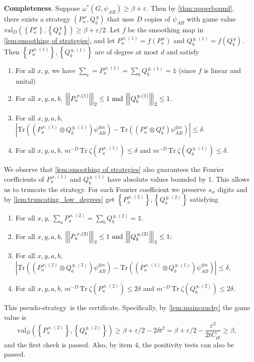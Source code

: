 \documentclass[11pt]{article}
\theoremstyle{plain}
\theoremstyle{definition}
\newcommand {\set} [1] {\ensuremath{ \left\lbrace #1 \right\rbrace }}
\newcommand {\br} [1] {\ensuremath{ \left( #1 \right) }}
\newcommand {\ab} [1] {\ensuremath{ \left| #1 \right| }}
\newcommand{\nnorm}[1]{{\left\vert\kern-0.25ex\left\vert\kern-0.25ex\left\vert #1
		\right\vert\kern-0.25ex\right\vert\kern-0.25ex\right\vert}}
\newcommand {\Tr} {\ensuremath{ \mathrm{Tr} }}
\newcommand {\id} {\ensuremath{\mathds{1}}}
\newcommand{\gval}[3]{\ensuremath{\mathrm{val}_{#1}\br{\set{#2},\set{#3}}}}
\newcommand{\ep} {\ensuremath{\varepsilon}}
\newcommand{\dmcc} {\ensuremath{C_{pt}}}
\newcommand{\dlbo} {\ensuremath{{D}}}
\newcommand{\dldd} {\ensuremath{{d}}}
\newcommand{\wireal} {\ensuremath{{s_{w}}}}
\newcommand{\pseudostrategy} {pseudo-strategy}
\newcommand{\Pss} {\ensuremath{P^{\,x}_a}}
\newcommand{\Qss} {\ensuremath{Q^{\,y}_b}}
\newcommand{\Pnn}[1] {\ensuremath{{P^{\,x, (#1)}_a}}}
\newcommand{\Qnn}[1] {\ensuremath{{Q^{\,y, (#1)}_b}}}
\newcommand{\1}{\mathbb{1}} %
\begin{document}
\textbf{Completeness}.
Suppose $\omega^*(G, \psi_{AB}) \ge \beta+\ep$.
Then by \cref{thm:upperbound},
there exists a strategy $\br{\Pss, \Qss}$ that uses $\dlbo$ copies of $\psi_{AB}$ with game value $\gval{\dlbo}{\Pss}{\Qss}\ge \beta+\ep/2$.
Let $f$ be the smoothing map in \cref{lem:smoothing of strategies}, and
let $\Pnn{1}=f(\Pss)$ and $\Qnn{1}=f(\Qss)$.
Then $\set{\Pnn{1}}, \set{\Qnn{1}}$ are of degree at most $\dldd$ and satisfy
\begin{enumerate}
    \item  For all $x, y$, we have $\sum_{a}=\Pnn{1}=\sum_{b}\Qnn{1}=\id$ (since $f$ is linear and unital)
	  \item For all $x, y, a, b$, $\nnorm{\Pnn{1}}_2\leq1~\mbox{and}~\nnorm{\Qnn{1}}_2\leq1$.

	  \item For all $x, y, a, b$, $\ab{\Tr\br{\br{\Pnn{1}\otimes \Qnn{1}}\psi^{\otimes n}_{AB}}-\Tr\br{\br{\Pss\otimes \Qss}\psi^{\otimes n}_{AB}}}\leq\delta$.
		\item For all $x, y, a, b$, $m^{-\dlbo}\,\Tr~\zeta\br{\Pnn{1}}\leq\delta$ and $m^{-\dlbo}\,\Tr~\zeta\br{\Qnn{1}}\leq\delta$.
\end{enumerate}
We observe that \cref{lem:smoothing of strategies} also guarantees
the Fourier coefficients of $\Pnn{1}$ and $\Qnn{1}$ have absolute values
bounded by $1$.
This allows us to truncate the strategy.
For each Fourier coefficient we preserve $\wireal$ digits and by \cref{lem:truncating_low_degrees} get $\set{\Pnn{2}}, \set{\Qnn{2}}$ satisfying
\begin{enumerate}
    \item For all $x, y$, $\sum_{a}\Pnn{2}=\sum_{b}\Qnn{2}=\id$.
	  \item For all $x, y, a, b$, $\nnorm{\Pnn{2}}_2\leq1~\mbox{and}~\nnorm{\Qnn{2}}_2\leq1;$
	  \item For all $x, y, a, b$, $\ab{\Tr\br{\br{\Pnn{2}\otimes \Qnn{2}}\psi^{\otimes n}_{AB}}-\Tr\br{\br{\Pnn{1}\otimes \Qnn{1}}\psi^{\otimes n}_{AB}}}\leq\delta,$
		\item For all $x, y, a, b$, $m^{-\dlbo}\,\Tr~\zeta\br{\Pnn{2}}\leq2\delta$ and $m^{-\dlbo}\,\Tr~\zeta\br{\Qnn{2}}\leq2\delta. $
\end{enumerate}
This \pseudostrategy\ is the certificate.
Specifically, by \cref{lem:maincauchy} the game value is
$$\gval{\dlbo}{\Pnn{2}}{\Qnn{2}}\ge\beta+\ep/2-2\delta t^2 = \beta+\ep/2-\frac{\ep^2}{2t\dmcc}\ge\beta,$$
and the first check is passed.
Also, by item 4, the positivity tests can also be passed.
\end{document}
